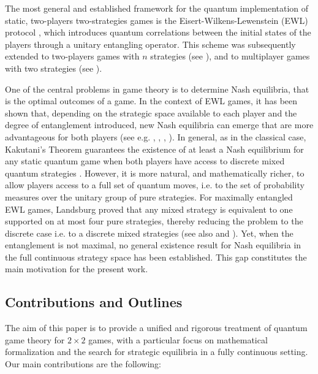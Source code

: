 \documentclass[11pt,a4paper,twoside]{article}
\begin{document}
The most general and established framework for the quantum implementation of static,  two-players two-strategies games is the Eisert-Wilkens-Lewenstein (EWL) protocol \cite{eisert_quantum}, which introduces quantum correlations between the initial states of the players through a unitary entangling operator. This scheme was subsequently extended to two-players games with $n$ strategies (see \cite{Hayden}), and to multiplayer games with two strategies (see \cite{bolonek1}). 

One of the central problems in game theory is to determine Nash equilibria, that is the optimal outcomes of a game. 
In the context of EWL games, it has been shown that, depending on the strategic space available to each player and the degree of entanglement introduced, new Nash equilibria can emerge that are more advantageous for both players (see e.g. \cite{eisert_2009}, \cite{eisert_quantum}, \cite{marinatto_weber}, \cite{flitney_hollenberg}). In general, as in the classical case, Kakutani's Theorem guarantees the existence of at least a Nash equilibrium for any static quantum game when both players have access to discrete mixed quantum strategies \cite{lee}. However, it is more natural, and mathematically richer, to allow players access to a full set of quantum moves, i.e. to the set of probability measures over the unitary group of pure strategies. For maximally entangled EWL games, Landsburg \cite{landsburg} proved that any mixed strategy is equivalent to one supported on at most four pure strategies, thereby reducing the problem to the discrete case i.e. to a discrete mixed strategies (see also \cite{bolonek1} and \cite{bolonek2}). Yet, when the entanglement is not maximal, no general existence result for Nash equilibria in the full continuous strategy space has been established. This gap constitutes the main motivation for the present work.
\subsection{Contributions and Outlines}

The aim of this paper is to provide a unified and rigorous treatment of quantum game theory for $2\times 2$ games, with a particular focus on mathematical formalization and the search for strategic equilibria in a fully continuous setting. Our main contributions are the following:
\end{document}
